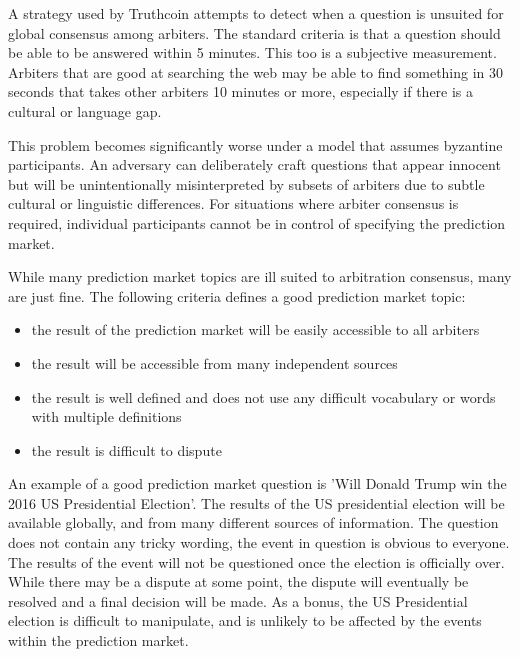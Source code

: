 \documentclass[onecolumn]{article}
\begin{document}
\begin{appendices}
A strategy used by Truthcoin \cite{truthcoin} attempts to detect when a question is unsuited for global consensus among arbiters.
The standard criteria is that a question should be able to be answered within 5 minutes.
This too is a subjective measurement.
Arbiters that are good at searching the web may be able to find something in 30 seconds that takes other arbiters 10 minutes or more, especially if there is a cultural or language gap.

This problem becomes significantly worse under a model that assumes byzantine participants.
An adversary can deliberately craft questions that appear innocent but will be unintentionally misinterpreted by subsets of arbiters due to subtle cultural or linguistic differences.
For situations where arbiter consensus is required, individual participants cannot be in control of specifying the prediction market.

While many prediction market topics are ill suited to arbitration consensus, many are just fine.
The following criteria defines a good prediction market topic:
\begin{itemize}
	\item the result of the prediction market will be easily accessible to all arbiters
	\item the result will be accessible from many independent sources
	\item the result is well defined and does not use any difficult vocabulary or words with multiple definitions
	\item the result is difficult to dispute
\end{itemize}

An example of a good prediction market question is 'Will Donald Trump win the 2016 US Presidential Election'.
The results of the US presidential election will be available globally, and from many different sources of information.
The question does not contain any tricky wording, the event in question is obvious to everyone.
The results of the event will not be questioned once the election is officially over.
While there may be a dispute at some point, the dispute will eventually be resolved and a final decision will be made.
As a bonus, the US Presidential election is difficult to manipulate, and is unlikely to be affected by the events within the prediction market.

\end{appendices}
\end{document}
